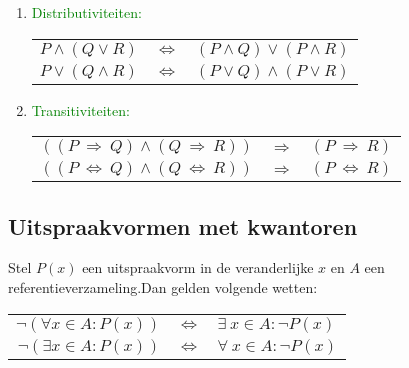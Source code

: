 \begin{enumerate}
\begin{tabular}{rcl}
\end{tabular}
\item \textcolor{green}{Distributiviteiten:}\newline
\begin{tabular}{rcl}
$P \wedge (Q\vee R)$ & $\Leftrightarrow $ & $(P \wedge Q) \vee (P\wedge R)$\\
$P \vee (Q\wedge R)$ & $\Leftrightarrow $ & $(P \vee Q) \wedge (P\vee R)$\\
\end{tabular}
\item \textcolor{green}{Transitiviteiten:}\newline
\begin{tabular}{rcl}
$((P \:\Rightarrow\: Q)\wedge (Q\:\Rightarrow\: R))$ & $ \Rightarrow $ & $(P \:\Rightarrow\: R)$ \\
$((P \:\Leftrightarrow\: Q)\wedge (Q\:\Leftrightarrow\: R))$ & $ \Rightarrow $ & $(P \:\Leftrightarrow\: R)$ \\
\end{tabular}
\end{enumerate}%
\vskip 0.5cm

\subsection{Uitspraakvormen met kwantoren} \label{uitspraakvormen_kwantoren}
\hypertarget{uitspraakvormen_kwantoren}{}
Stel $P(x)$ een uitspraakvorm in de veranderlijke $x$ en $A$ een referentieverzameling.\newline Dan gelden volgende wetten:\vskip 0.5cm
\begin{tabular}{rcl}
$\neg(\forall x \in A:P(x)) $ & $\Leftrightarrow$ & $\exists\: x \in A: \neg P(x)$\\
$\neg(\exists x \in A:P(x)) $ & $\Leftrightarrow$ & $\forall\: x \in A: \neg P(x)$\\
\end{tabular}



